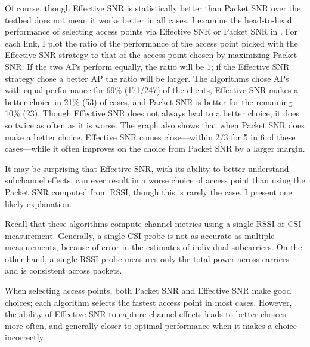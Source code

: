 Of course, though Effective SNR is statistically better than Packet SNR over the testbed does not mean it works better in all cases. I examine the head-to-head performance of selecting access points via Effective SNR or Packet SNR in . For each link, I plot the ratio of the performance of the access point picked with the Effective SNR strategy to that of the access point chosen by maximizing Packet SNR. If the two APs perform equally, the ratio will be 1; if the Effective SNR strategy chose a better AP the ratio will be larger. The algorithms chose APs with equal performance for 69\% (171/247) of the clients, Effective SNR makes a better choice in 21\% (53) of cases, and Packet SNR is better for the remaining 10\% (23). Though Effective SNR does not always lead to a better choice, it does so twice as often as it is worse. The graph also shows that when Packet SNR does make a better choice, Effective SNR comes close---within 2/3 for 5 in 6 of these cases---while it often improves on the choice from Packet SNR by a larger margin.

 It may be surprising that Effective SNR, with its ability to better understand subchannel effects, can ever result in a worse choice of access point than using the Packet SNR computed from RSSI, though this is rarely the case. I present one likely explanation.

Recall that these algorithms compute channel metrics using a single RSSI or CSI measurement. Generally, a single CSI probe is not as accurate as multiple measurements, because of error in the estimates of individual subcarriers. On the other hand, a single RSSI probe measures only the total power across carriers and is consistent across packets.

 When selecting access points, both Packet SNR and Effective SNR make good choices; each algorithm selects the fastest access point in most cases. However, the ability of Effective SNR to capture channel effects leads to better choices more often, and generally closer-to-optimal performance when it makes a choice incorrectly.


